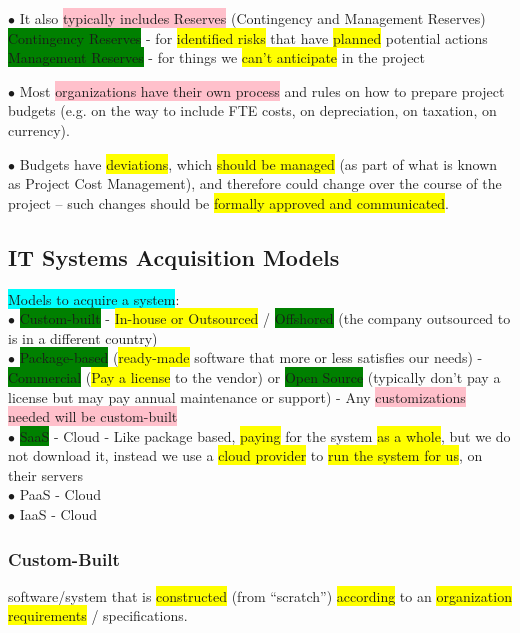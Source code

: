 \documentclass[]{project_plan}
\newcommand{\bulletPoint}{\hspace{-3.1pt}$\bullet$ \hspace{5pt}}
\begin{document}
\bulletPoint It also \colorbox{pink}{typically includes Reserves} (Contingency and Management Reserves)\\
\colorbox{green}{Contingency Reserves} - for \colorbox{yellow}{identified risks} that have \colorbox{yellow}{planned} potential actions\\
\colorbox{green}{Management Reserves} - for things we \colorbox{yellow}{can't anticipate} in the project

\bulletPoint Most \colorbox{pink}{organizations have their own process} and rules on how to prepare project budgets (e.g.
on the way to include FTE costs, on depreciation, on taxation, on currency).

\bulletPoint Budgets have \colorbox{yellow}{deviations}, which \colorbox{yellow}{should be managed} (as part of what is known as Project Cost
Management), and therefore could change over the course of the project – such changes
should be \colorbox{yellow}{formally approved and communicated}.

\newpage

\subsection{IT Systems Acquisition Models}

\colorbox{cyan}{Models to acquire a system}:\\
\bulletPoint \colorbox{green}{Custom-built} - \colorbox{yellow}{In-house or Outsourced} / \colorbox{green}{Offshored} (the company outsourced to is in a different country)\\
\bulletPoint \colorbox{green}{Package-based} (\colorbox{yellow}{ready-made} software that more or less satisfies our needs) - \colorbox{green}{Commercial} (\colorbox{yellow}{Pay a license} to the vendor) or \colorbox{green}{Open Source} (typically don't pay a license but may pay annual maintenance or support) - Any \colorbox{pink}{customizations needed will be custom-built}\\
\bulletPoint \colorbox{green}{SaaS} - Cloud - Like package based, \colorbox{yellow}{paying} for the system \colorbox{yellow}{as a whole}, but we do not download it, instead we use a \colorbox{yellow}{cloud provider} to \colorbox{yellow}{run the system for us}, on their servers \\
\bulletPoint PaaS - Cloud\\
\bulletPoint IaaS - Cloud\\

\subsubsection{Custom-Built}
software/system that is \colorbox{yellow}{constructed} (from “scratch”) \colorbox{yellow}{according} to an
\colorbox{yellow}{organization requirements} / specifications.
\end{document}
